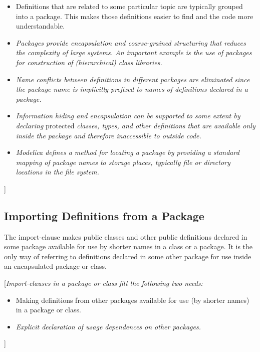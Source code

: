 \documentclass[10pt,a4paper]{report}
\def\doublelabel#1{\label{#1}\hypertarget{#1}{}}
\begin{document}
\begin{itemize}
\item
  Definitions that are related to some particular topic are typically
  grouped into a package. This makes those definitions easier to find
  and the code more understandable.
\item
  \emph{Packages provide encapsulation and coarse-grained structuring
  that reduces the complexity of large systems. An important example is
  the use of packages for construction of (hierarchical) class
  libraries.}
\item
  \emph{Name conflicts between definitions in different packages are
  eliminated since the package name is implicitly prefixed to names of
  definitions declared in a package.}
\item
  \emph{Information hiding and encapsulation can be supported to some
  extent by declaring} protected \emph{classes, types, and other
  definitions that are available only inside the package and therefore
  inaccessible to outside code.}
\item
  \emph{Modelica defines a method for locating a package by providing a
  standard mapping of package names to storage places, typically file or
  directory locations in the file system. }
\end{itemize}

{]}

\subsection{Importing Definitions from a Package}\doublelabel{importing-definitions-from-a-package}

The import-clause makes public classes and other public definitions
declared in some package available for use by shorter names in a class
or a package. It is the only way of referring to definitions declared in
some other package for use inside an encapsulated package or class.

{[}\emph{Import-clauses in a package or class fill the following two
needs:}

\begin{itemize}
\item
  Making definitions from other packages available for use (by shorter
  names) in a package or class.
\item
  \emph{Explicit declaration of usage dependences on other packages.}
\end{itemize}

{]}
\end{document}

